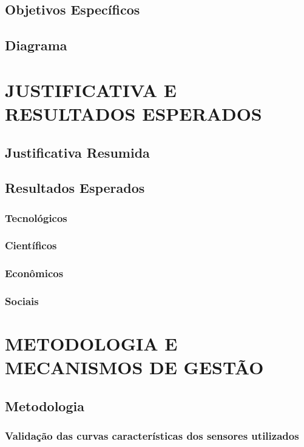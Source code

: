 \documentclass[a4paper]{article}
\begin{document}
\subsection{Objetivos Específicos}

\subsection{Diagrama}

\section{JUSTIFICATIVA E RESULTADOS ESPERADOS}

\subsection{Justificativa Resumida}

\subsection{Resultados Esperados}

\subsubsection{Tecnológicos}

\subsubsection{Científicos}

\subsubsection{Econômicos}

\subsubsection{Sociais}

\section{METODOLOGIA E MECANISMOS DE GESTÃO}

\subsection{Metodologia}

\subsubsection{Validação das curvas características dos sensores utilizados}
\end{document}
